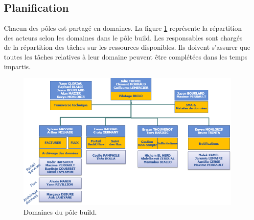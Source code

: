 \documentclass[12pt,a4paper]{article}
\begin{document}
\subsection{Planification}
Chacun des pôles est partagé en domaines. La figure \ref{domaines} représente la répartition des acteurs selon les domaines dans le pôle build. Les responsables sont chargés de la répartition des tâches sur les ressources disponibles. Ils doivent s'assurer que toutes les tâches relatives à leur domaine peuvent être complétées dans les temps impartis.
\begin{figure}[H]
	\begin{center}
		\includegraphics[width=\textwidth,height=\textheight,keepaspectratio]{domaines.png}
		\caption{Domaines du pôle build.}
		\label{domaines}
	\end{center}
\end{figure}
\end{document}
